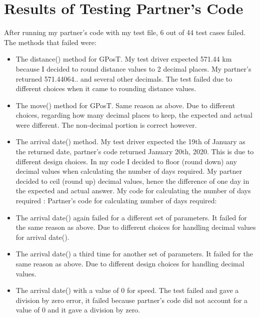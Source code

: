 \documentclass[12pt]{article}
\begin{document}
\section{Results of Testing Partner's Code}

After running my partner's code with my test file, 6 out of 44 test cases failed. The methods that failed were:
\begin{itemize}
	\item The distance() method for GPosT. My test driver expected 571.44 km because I decided to round distance values to 2 decimal places. My partner's returned 571.44064.. and several other decimals. The test failed due to different choices when it came to rounding distance values.

	\item The move() method for GPosT. Same reason as above. Due to different choices, regarding how many decimal places to keep, the expected and actual were different. The non-decimal portion is correct however.

	\item The arrival \textunderscore date() method. My test driver expected the 19th of January as the returned date, partner's code returned January 20th, 2020. This is due to different design choices. In my code I decided to floor (round down) any decimal values when calculating the number of days required. My partner decided to ceil (round up) decimal values, hence the difference of one day in the expected and actual answer. My code for calculating the number of days required :  Partner's code for calculating number of days required:  

	\item The arrival \textunderscore date() again failed for a different set of parameters. It failed for the same reason as above. Due to different choices for handling decimal values for arrival \textunderscore date(). 

	\item The arrival \textunderscore date() a third time for another set of parameters. It failed for the same reason as above. Due to different design choices for handling decimal values.
	
	\item The arrival \textunderscore date() with a value of 0 for speed. The test failed and gave a division by zero error, it failed because partner's code did not account for a value of 0 and it gave a division by zero.


\end{itemize}
\end{document}
